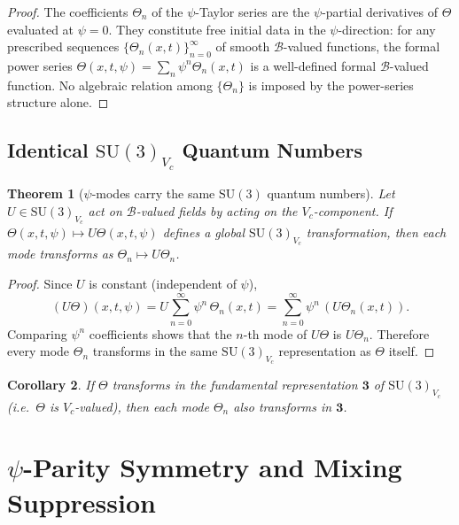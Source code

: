 \documentclass[12pt,a4paper]{article}
\newtheorem{theorem}{Theorem}[section]
\newtheorem{corollary}[theorem]{Corollary}
\theoremstyle{remark}
\begin{document}
\begin{proof}
  The coefficients $\Theta_n$ of the $\psi$-Taylor series are the
  $\psi$-partial derivatives of $\Theta$ evaluated at $\psi=0$.
  They constitute free initial data in the $\psi$-direction: for any
  prescribed sequences $\{\Theta_n(x,t)\}_{n=0}^\infty$ of smooth
  $\mathcal{B}$-valued functions, the formal power series
  $\Theta(x,t,\psi) = \sum_n \psi^n \Theta_n(x,t)$ is a well-defined
  formal $\mathcal{B}$-valued function.  No algebraic relation among
  $\{\Theta_n\}$ is imposed by the power-series structure alone.
\end{proof}

\subsection{Identical $\mathrm{SU}(3)_{V_c}$ Quantum Numbers}

\begin{theorem}[$\psi$-modes carry the same $\mathrm{SU}(3)$ quantum numbers]
  \label{thm:same_su3}
  Let $U \in \mathrm{SU}(3)_{V_c}$ act on $\mathcal{B}$-valued fields by
  acting on the $V_c$-component.  If $\Theta(x,t,\psi) \mapsto U\Theta(x,t,\psi)$
  defines a global $\mathrm{SU}(3)_{V_c}$ transformation, then each mode
  transforms as $\Theta_n \mapsto U\Theta_n$.
\end{theorem}

\begin{proof}
  Since $U$ is constant (independent of $\psi$),
  \[
    (U\Theta)(x,t,\psi) = U\!\sum_{n=0}^\infty \psi^n\,\Theta_n(x,t)
    = \sum_{n=0}^\infty \psi^n\,(U\Theta_n(x,t)).
  \]
  Comparing $\psi^n$ coefficients shows that the $n$-th mode of $U\Theta$ is
  $U\Theta_n$.  Therefore every mode $\Theta_n$ transforms in the same
  $\mathrm{SU}(3)_{V_c}$ representation as $\Theta$ itself.
\end{proof}

\begin{corollary}
  If $\Theta$ transforms in the fundamental representation $\mathbf{3}$ of
  $\mathrm{SU}(3)_{V_c}$ (i.e.\ $\Theta$ is $V_c$-valued), then each mode
  $\Theta_n$ also transforms in $\mathbf{3}$.
\end{corollary}

\section{$\psi$-Parity Symmetry and Mixing Suppression}
\label{sec:parity}
\end{document}
